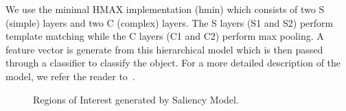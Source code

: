 We use the minimal HMAX implementation (hmin) which consists of two S (simple) layers and two C (complex) layers. The S layers (S1 and S2) perform template matching while the C layers (C1 and C2) perform max pooling. A feature vector is generate from this hierarchical model which is then passed through a classifier to classify the object. For a more detailed description of the model, we refer the reader to~\cite{Mutch2008}.

\begin{figure}[ht!]
\centering
{}
\caption{\label{fig:RoIs_campus_000042} Regions of Interest generated by Saliency Model.}
\end{figure}


